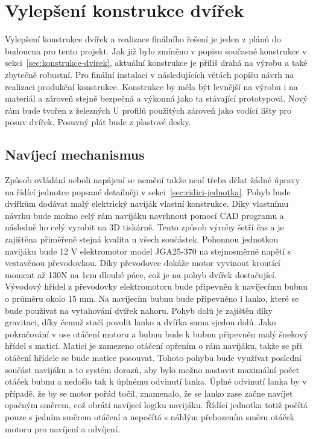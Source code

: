 \section{Vylepšení konstrukce dvířek}\label{sec:vylepseni-konstrukce-dvirek}
Vylepšení konstrukce dvířek a realizace finálního řešení je jeden z plánů do budoucna pro tento projekt.
Jak již bylo zmíněno v popisu současné konstrukce v sekci~\ref{sec:konstrukce-dvirek}, aktuální konstrukce je příliš drahá na výrobu a také zbytečně robustní.
Pro finální instalaci v následujících větách popíšu návrh na realizaci produkční konstrukce.\newline
Konstrukce by měla být levnější na výrobu i na materiál a zároveň stejně bezpečná a výkonná jako ta stávající prototypová.
Nový rám bude tvořen z železných U profilů použitých zároveň jako vodící lišty pro posuv dvířek.
Posuvný plát bude z plastové desky.

\subsection*{Navíjecí mechanismus}\label{subsec:navijeci-mechanismus}
Způsob ovládání neboli napájení se nemění takže není třeba dělat žádné úpravy na řídící jednotce popsané detailněji v sekci~\ref{sec:ridici-jednotka}.
Pohyb bude dvířkům dodávat malý elektrický naviják vlastní konstrukce.
Díky vlastnímu návrhu bude možno celý rám navijáku navrhnout pomocí CAD programu a následně ho celý vyrobit na 3D tiskárně.
Tento způsob výroby šetří čas a je zajištěna přiměřeně stejná kvalita u všech součástek.
Pohonnou jednotkou navijáku bude 12 V elektromotor model JGA25-370 na stejnosměrné napětí s vestavěnou převodovkou.
Díky převodovce dokáže motor vyvinout kroutící moment až 130N na 1cm dlouhé páce, což je na pohyb dvířek dostačující.
Vývodový hřídel z převodovky elektromotoru bude připevněn k navíjecímu bubnu o průměru okolo 15 mm.
Na navíjecím bubnu bude připevněno i lanko, které se bude používat na vytahování dvířek nahoru.
Pohyb dolů je zajištěn díky gravitaci, díky čemuž stačí povolit lanko a dvířka sama sjedou dolů.
Jako pokračování v ose otáčení motoru a bubnu bude k bubnu připevněn malý šnekový hřídel s maticí.
Matici je zamezeno otáčení opřením o rám navijáku, takže se při otáčení hřídele se bude matice posouvat.
Tohoto pohybu bude využívat poslední součást navijáku a to systém dorazů, aby bylo možno nastavit maximální počet otáček bubnu a nedošlo tak k úplnému odvinutí lanka.
Úplné odvinutí lanka by v případě, že by se motor pořád točil, znamenalo, že se lanko zase začne navíjet opačným směrem, což obrátí navíjecí logiku navijáku.
Řídící jednotka totiž počítá pouze s jedním směrem otáčení a nepočítá s náhlým přehozením směru otáček motoru pro navíjení a odvíjení.


